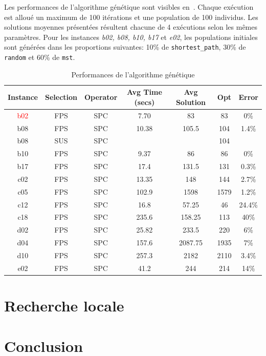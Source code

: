 \documentclass[10pt]{article}
\begin{document}
	Les performances de l'algorithme génétique sont visibles en~. Chaque exécution est alloué un maximum de 100 itérations et une population de 100 individus. Les solutions moyennes présentées résultent chacune de 4 exécutions selon les mêmes paramètres.
	Pour les instances \textit{b02, b08, b10, b17} et \textit{e02}, les populations initiales sont générées dans les proportions suivantes: 10\% de \texttt{shortest\_path}, 30\% de \texttt{random} et 60\% de \texttt{mst}.
	\begin{table}[h!]
		\centering
		\begin{tabular}{|c|c|c|c|c|c|c|}
		\hline
\textbf{Instance} & \textbf{Selection} & \textbf{Operator} & \textbf{Avg Time (secs)} & \textbf{Avg Solution} & \textbf{Opt} & \textbf{Error} \\
\hline
\textcolor{red}{b02} & FPS & SPC & 7.70 & 83 & 83 & 0\% \\
b08 & FPS & SPC & 10.38 & 105.5 & 104 & 1.4\% \\
b08 & SUS & SPC & & & 104 & \\
b10 & FPS & SPC & 9.37 & 86 & 86 & 0\% \\

b17 & FPS & SPC & 17.4 & 131.5 & 131 & 0.3\% \\

c02 & FPS & SPC & 13.35 & 148 & 144 & 2.7\% \\

c05 & FPS & SPC & 102.9 & 1598 & 1579 & 1.2\% \\

c12 & FPS & SPC & 16.8 & 57.25 & 46 & 24.4\% \\

c18 & FPS & SPC & 235.6 & 158.25 & 113 & 40\% \\

d02 & FPS & SPC & 25.82 & 233.5 & 220 & 6\% \\

d04 & FPS & SPC & 157.6 & 2087.75 & 1935 & 7\% \\

d10 & FPS & SPC & 257.3 & 2182 & 2110 & 3.4\% \\

e02 & FPS & SPC & 41.2 & 244 & 214 & 14\% \\
		\end{tabular}
		\caption{Performances de l'algorithme génétique}
		\label{tab-perfgen}
	\end{table}

	
\section{Recherche locale}
\section{Conclusion}
	
\end{document}
